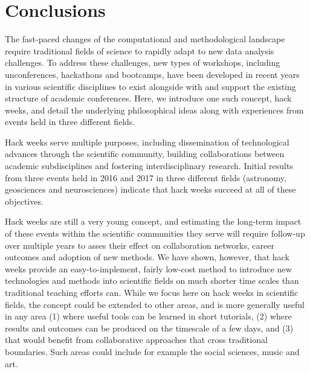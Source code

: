 
\section*{Conclusions}

The fast-paced changes of the computational and methodological landscape require traditional fields of science to rapidly adapt to new data analysis challenges.
To address these challenges, new types of workshops, including unconferences, hackathons and bootcamps, have been developed in recent years in various scientific disciplines to exist alongside with and support the existing structure of academic conferences.
Here, we introduce one such concept, hack weeks, and detail the underlying philosophical ideas along with experiences from events held in three different fields.

Hack weeks serve multiple purposes, including dissemination of technological advances through the scientific community, building collaborations between academic subdisciplines and fostering interdisciplinary research. Initial results from three events held in 2016 and 2017 in three different fields (astronomy, geosciences and neurosciences) indicate that hack weeks succeed at all of these objectives.

Hack weeks are still a very young concept, and estimating the long-term impact of these events within the scientific communities they serve will require follow-up over multiple years to asses their effect on collaboration networks, career outcomes and adoption of new methods.
We have shown, however, that hack weeks provide an easy-to-implement, fairly low-cost method to introduce new technologies and methods into scientific fields on much shorter time scales than traditional teaching efforts can.
While we focus here on hack weeks in scientific fields, the concept could be extended to other areas, and is more generally useful in any area (1) where useful tools can be learned in short tutorials, (2) where results and outcomes can be produced on the timescale of a few days, and (3) that would benefit from collaborative approaches that cross traditional boundaries. Such areas could include for example the social sciences, music and art.
